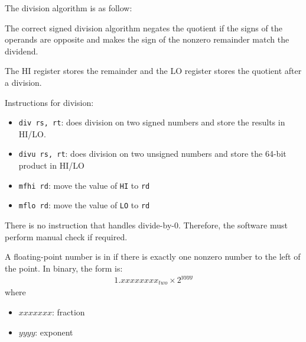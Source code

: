     \par The division algorithm is as follow:
      \begin{algorithm}[H]
        \begin{algorithmic}[1]
              \Else
              \ENDIF
            \ENDFOR
          \ENDPROCEDURE
        \end{algorithmic}
      \end{algorithm}

    \par The correct signed division algorithm negates the quotient if the
    signs of the operands are opposite and makes the sign of the nonzero
    remainder match the dividend.

    \par The HI register stores the remainder and the LO register stores the
      quotient after a division.
    \par Instructions for division:
      \begin{itemize}
        \item \lstinline{div rs, rt}: does division on two signed numbers and
          store the results in HI/LO.
        \item \lstinline{divu rs, rt}: does division on two unsigned numbers and
          store the 64-bit product in HI/LO
        \item \lstinline{mfhi rd}: move the value of \lstinline{HI} to \lstinline{rd}
        \item \lstinline{mflo rd}: move the value of \lstinline{LO} to \lstinline{rd}
      \end{itemize}
    \par There is no instruction that handles divide-by-0. Therefore, the
      software must perform manual check if required.

    \par A floating-point number is in  if there is exactly
    one nonzero number to the left of the  point. In binary, the
    form is:
    \begin{align*}
      1.xxxxxxxx_{two} \times 2^{yyyy}
    \end{align*}
    where
    \begin{itemize}
      \item $xxxxxxx$: fraction
      \item $yyyy$: exponent
    \end{itemize}

